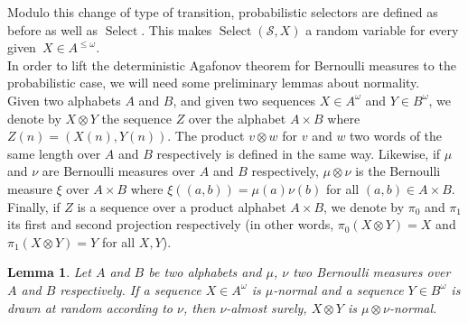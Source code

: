 \documentclass[11pt]{article}
\newtheorem{lemma}{Lemma}
\renewcommand{\S}{\mathcal{S}}
\DeclareMathOperator{\select}{Select}
\begin{document}
Modulo this change of type of transition, probabilistic selectors are defined as before as well as $\select$. This makes $\select(\S,X)$ a random variable for every given~$X \in A^{\leq \omega}$. \\




In order to lift the deterministic Agafonov theorem for Bernoulli measures to the probabilistic case, we will need some preliminary lemmas about normality. \\

Given two alphabets $A$ and $B$, and given two sequences $X \in A^\omega$ and $Y \in B^\omega$, we denote by $X \otimes Y$ the sequence $Z$ over the alphabet $A \times B$ where $Z(n)=(X(n),Y(n))$. The product $v \otimes w$ for $v$ and $w$ two words of the same length over $A$ and $B$ respectively is defined in the same way. Likewise, if $\mu$ and $\nu$ are Bernoulli measures over $A$ and $B$ respectively, $\mu \otimes \nu$ is the Bernoulli measure $\xi$ over $A \times B$ where $\xi((a,b))=\mu(a)\nu(b)$ for all $(a,b) \in A \times B$. Finally, if $Z$ is a sequence over a product alphabet $A \times B$, we denote by $\pi_0$ and $\pi_1$ its first and second projection respectively (in other words, $\pi_0(X \otimes Y)=X$ and $\pi_1(X \otimes Y)=Y$ for all $X,Y$). 

\begin{lemma}\label{lem:random-join}
Let $A$ and $B$ be two alphabets and $\mu$, $\nu$ two Bernoulli measures over $A$ and $B$ respectively. If a sequence $X \in A^\omega$ is $\mu$-normal and a sequence $Y \in B^\omega$ is drawn at random according to $\nu$, then $\nu$-almost surely, $X \otimes Y$ is $\mu \otimes \nu$-normal. 
\end{lemma}
\end{document}
